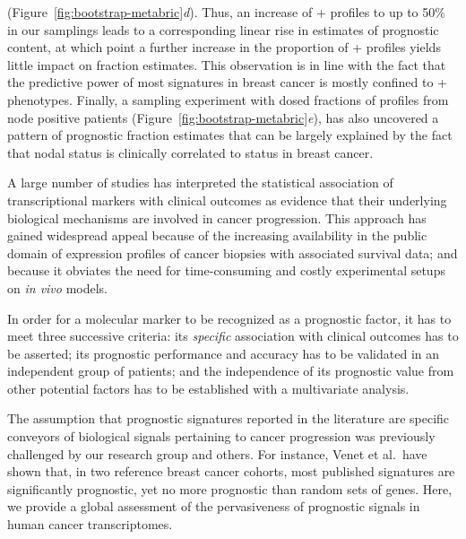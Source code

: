 (Figure~\ref{fig:bootstrap-metabric}\emph{d}).  Thus, an increase of
+ profiles to up to 50\% in our samplings leads to a corresponding
linear rise in estimates of prognostic content, at which point a further
increase in the proportion of + profiles yields little impact on
fraction estimates.  This observation is in line with the fact that the
predictive power of most signatures in breast cancer is mostly confined to
+ phenotypes.\cite{weigelt_challenges_2012} Finally, a sampling
experiment with dosed fractions of profiles from node positive patients
(Figure~\ref{fig:bootstrap-metabric}\emph{e}), has also uncovered a pattern of
prognostic fraction estimates that can be largely explained by the fact that
nodal status is clinically correlated to  status in breast cancer.

\medskip

A large number of studies has interpreted the statistical association of
transcriptional markers with clinical outcomes as evidence that their underlying
biological mechanisms are involved in cancer progression.  This approach has
gained widespread appeal because of the increasing availability in the public
domain of expression profiles of cancer biopsies with associated survival data;
and because it obviates the need for time-consuming and costly experimental
setups on \emph{in vivo} models.

In order for a molecular marker to be recognized as a prognostic factor, it has
to meet three successive criteria: its \emph{specific} association with clinical
outcomes has to be asserted; its prognostic performance and accuracy has to be
validated in an independent group of patients; and the independence of its
prognostic value from other potential factors has to be established with a
multivariate analysis.\cite{chibon_cancer_2013}

The assumption that prognostic signatures reported in the literature are
specific conveyors of biological signals pertaining to cancer progression was
previously challenged by our research group and
others.\cite{venet_most_2011,lauss_prediction_2010,ein-dor_outcome_2005,mosley_cell_2008}
For instance, Venet et al.\ have shown that, in two reference breast cancer
cohorts, most published signatures are significantly prognostic, yet no more
prognostic than random sets of genes.\cite{venet_most_2011}
Here, we provide a global assessment of the pervasiveness of prognostic signals
in human cancer transcriptomes.

